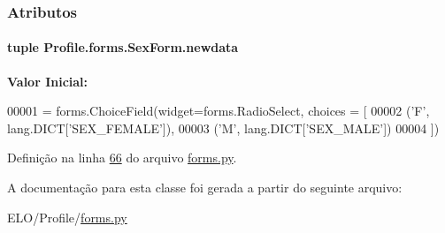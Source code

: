 \subsubsection{Atributos}
\hypertarget{classProfile_1_1forms_1_1SexForm_a0d99412ab99ee46149a50fabb2614845}{
\paragraph[{newdata}]{\setlength{\rightskip}{0pt plus 5cm}tuple Profile.\-forms.\-Sex\-Form.\-newdata\hspace{0.3cm}{\ttfamily [static]}}}\label{classProfile_1_1forms_1_1SexForm_a0d99412ab99ee46149a50fabb2614845}
{\bfseries Valor Inicial\-:}
\begin{DoxyCode}
00001 = forms.ChoiceField(widget=forms.RadioSelect, choices = [
00002                                             (\textcolor{stringliteral}{'F'}, lang.DICT[\textcolor{stringliteral}{'SEX\_FEMALE'}]),
00003                                             (\textcolor{stringliteral}{'M'}, lang.DICT[\textcolor{stringliteral}{'SEX\_MALE'}])
00004                                                 ])
\end{DoxyCode}


Definição na linha \hyperlink{Profile_2forms_8py_source_l00066}{66} do arquivo \hyperlink{Profile_2forms_8py_source}{forms.\-py}.



A documentação para esta classe foi gerada a partir do seguinte arquivo\-:\begin{DoxyCompactItemize}
\item 
E\-L\-O/\-Profile/\hyperlink{Profile_2forms_8py}{forms.\-py}\end{DoxyCompactItemize}
